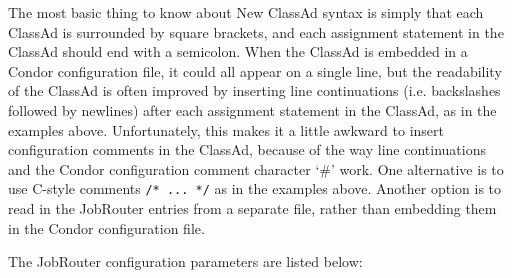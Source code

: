 The most basic thing to know about New ClassAd syntax is simply that
each ClassAd is surrounded by square brackets, and each assignment
statement in the ClassAd should end with a semicolon.  When the
ClassAd is embedded in a Condor configuration file, it could all
appear on a single line, but the readability of the ClassAd is often
improved by inserting line continuations (i.e. backslashes followed by
newlines) after each assignment statement in the ClassAd, as in the
examples above.  Unfortunately, this makes it a little awkward to
insert configuration comments in the ClassAd, because of the way line
continuations and the Condor configuration comment character `\#' work.
One alternative is to use C-style comments \verb|/* ... */| as in the
examples above.  Another option is to read in the JobRouter entries
from a separate file, rather than embedding them in the Condor
configuration file.

The JobRouter configuration parameters are listed below:

